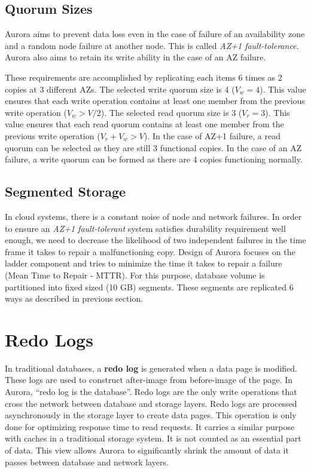 \documentclass[conference]{IEEEtran}
\begin{document}
\subsection{Quorum Sizes}
Aurora aims to prevent data loss even in the case of failure of an availability zone and a random node failure at another node. This is called \textit{AZ+1 fault-tolerance}. Aurora also aims to retain its write ability in the case of an AZ failure.

These requirements are accomplished by replicating each items 6 times as 2 copies at 3 different AZs. The selected write quorum size is 4 ($V_w = 4$). This value ensures that each write operation contains at least one member from the previous write operation ($V_w > V/2$). The selected read quorum size is 3 ($V_r = 3$). This value ensures that each read quorum contains at least one member from the previous write operation ($V_r + V_w > V$). In the case of AZ+1 failure, a read quorum can be selected as they are still 3 functional copies. In the case of an AZ failure, a write quorum can be formed as there are 4 copies functioning normally. 

\subsection{Segmented Storage}
In cloud systems, there is a constant noise of node and network failures. In order to ensure an \textit{AZ+1 fault-tolerant} system satisfies durability requirement well enough, we need to decrease the likelihood of two independent failures in the time frame it takes to repair a malfunctioning copy. Design of Aurora focuses on the ladder component and tries to minimize the time it takes to repair a failure (Mean Time to Repair - MTTR). For this purpose, database volume is partitioned into fixed sized (10 GB) segments. These segments are replicated 6 ways as described in previous section.  

\section{Redo Logs}
In traditional databases, a \textbf{redo log} is generated when a data page is modified. These logs are used to construct after-image from before-image of the page. In Aurora, ``redo log is the database''. Redo logs are the only write operations that cross the network between database and storage layers.
Redo logs are processed asynchronously in the storage layer to create data pages. This operation is only done for optimizing response time to read requests. It carries a similar purpose with caches in a traditional storage system. It is not counted as an essential part of data. This view allows Aurora to significantly shrink the amount of data it passes between database and network layers.
\end{document}
